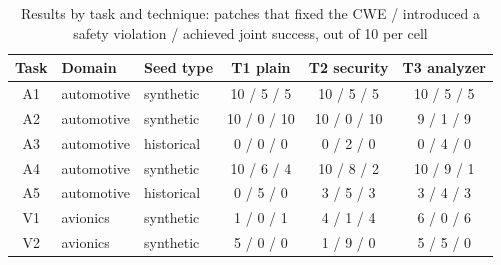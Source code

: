 \documentclass[12pt]{IEEEtran}
\begin{document}
\begin{table}[t]
    \centering
    \caption{Results by model and technique ($n=35$ each)}
    \label{tab:model}
    \footnotesize
\end{table}

\begin{table}[t]
    \centering
    \caption{Results by task and technique: patches that fixed the CWE / introduced a safety violation / achieved joint success, out of 10 per cell}
    \label{tab:task}
    \footnotesize
    \begin{tabular}{|c|l|l|c|c|c|}
        \hline
        \textbf{Task} & \textbf{Domain} & \textbf{Seed type} & \textbf{T1 plain} & \textbf{T2 security} & \textbf{T3 analyzer} \\
        \hline
        A1 & automotive & synthetic  & 10 / 5 / 5  & 10 / 5 / 5  & 10 / 5 / 5 \\
        A2 & automotive & synthetic  & 10 / 0 / 10 & 10 / 0 / 10 & 9 / 1 / 9 \\
        A3 & automotive & historical & 0 / 0 / 0   & 0 / 2 / 0   & 0 / 4 / 0 \\
        A4 & automotive & synthetic  & 10 / 6 / 4  & 10 / 8 / 2  & 10 / 9 / 1 \\
        A5 & automotive & historical & 0 / 5 / 0   & 3 / 5 / 3   & 3 / 4 / 3 \\
        \hline
        V1 & avionics   & synthetic  & 1 / 0 / 1   & 4 / 1 / 4   & 6 / 0 / 6 \\
        V2 & avionics   & synthetic  & 5 / 0 / 0   & 1 / 9 / 0   & 5 / 5 / 0 \\
        \hline
    \end{tabular}
\end{table}
\end{document}

